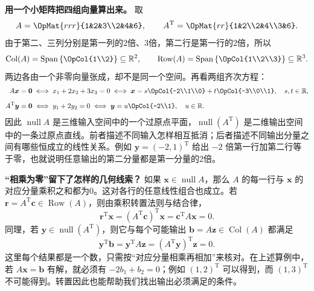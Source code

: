 \documentclass[a4paper,12pt,twoside,openany,fontset=none]{ctexbook}
\numberwithin{equation}{chapter}
\begin{document}
\par\medskip\noindent\textbf{用一个小矩阵把四组向量算出来。}
取
\[
 A=\OpMat{rrr}{1&2&3\\2&4&6},\qquad
 A^{\mathrm T}=\OpMat{rr}{1&2\\2&4\\3&6}.
\]
由于第二、三列分别是第一列的2倍、3倍，第二行是第一行的2倍，所以
\[
 \operatorname{Col}(A)=\operatorname{Span}\left\{\OpCol{1\\2}\right\}\subseteq\mathbb R^2,
 \qquad
 \operatorname{Row}(A)=\operatorname{Span}\left\{\OpCol{1\\2\\3}\right\}\subseteq\mathbb R^3.
\]
两边各由一个非零向量张成，却不是同一个空间。再看两组齐次方程：
\[
\begin{aligned}
 A\boldsymbol x=\boldsymbol0
 &\iff x_1+2x_2+3x_3=0
 \iff \boldsymbol x=s\OpCol{-2\\1\\0}+t\OpCol{-3\\0\\1},\quad s,t\in\mathbb R,\\[5pt]
 A^{\mathrm T}\boldsymbol y=\boldsymbol0
 &\iff y_1+2y_2=0
 \iff \boldsymbol y=u\OpCol{-2\\1},\quad u\in\mathbb R.
\end{aligned}
\]
因此 $\operatorname{null}A$ 是三维输入空间中的一个过原点平面，$\operatorname{null}(A^{\mathrm T})$ 是二维输出空间中的一条过原点直线。前者描述不同输入怎样相互抵消；后者描述不同输出分量之间有哪些恒成立的线性关系。例如 $\boldsymbol y=(-2,1)^{\mathrm T}$ 给出 $-2$ 倍第一行加第二行等于零，也就说明任意输出的第二分量都是第一分量的2倍。

\par\medskip\noindent\textbf{“相乘为零”留下了怎样的几何线索？}
如果 $\boldsymbol x\in\operatorname{null}A$，那么 $A$ 的每一行与 $\boldsymbol x$ 的对应分量乘积之和都为0。这对各行的任意线性组合也成立。若 $\boldsymbol r=A^{\mathrm T}\boldsymbol c\in\operatorname{Row}(A)$，则由乘积转置法则与结合律，
\[
 \boldsymbol r^{\mathrm T}\boldsymbol x
 =(A^{\mathrm T}\boldsymbol c)^{\mathrm T}\boldsymbol x
 =\boldsymbol c^{\mathrm T}A\boldsymbol x=0.
\]
同理，若 $\boldsymbol y\in\operatorname{null}(A^{\mathrm T})$，则它与每个可能输出 $\boldsymbol b=A\boldsymbol z\in\operatorname{Col}(A)$ 都满足
\[
 \boldsymbol y^{\mathrm T}\boldsymbol b
 =\boldsymbol y^{\mathrm T}A\boldsymbol z
 =(A^{\mathrm T}\boldsymbol y)^{\mathrm T}\boldsymbol z=0.
\]
这里每个结果都是一个数，只需按“对应分量相乘再相加”来核对。在上述算例中，若 $A\boldsymbol x=\boldsymbol b$ 有解，就必须有 $-2b_1+b_2=0$；例如 $(1,2)^{\mathrm T}$ 可以得到，而 $(1,3)^{\mathrm T}$ 不可能得到。转置因此也能帮助我们找出输出必须满足的条件。
\end{document}
